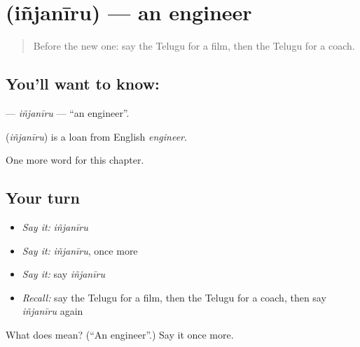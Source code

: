 \section[\texorpdfstring{\te{ఇంజనీరు} (iñjanīru)}{ఇంజనీరు (iñjanīru)}]{ (iñjanīru) — an engineer}

\label{lesson:TE-C312-injaniru}



\begin{quote}
Before the new one: say the Telugu for a film, then the Telugu for a coach.
\end{quote}

\subsection*{You'll want to know: }
\textbf{} — \emph{iñjanīru} — \textquotedblleft{}an engineer\textquotedblright{}.

\begin{cousinweb}
\textbf{} (\emph{iñjanīru}) is a loan from English \emph{engineer}.
\end{cousinweb}

\begin{grammarlens}[title={What you've built}]
One more word for this chapter.
\end{grammarlens}

\subsection*{Your turn}
\begin{itemize}
\raggedright
  \item \emph{Say it:} \emph{iñjanīru}
  \item \emph{Say it:} \emph{iñjanīru}, once more
  \item \emph{Say it:} say \emph{iñjanīru}
  \item \emph{Recall:} say the Telugu for a film, then the Telugu for a coach, then say \emph{iñjanīru} again
\end{itemize}

\begin{tcolorbox}[breakable,colback=teal!4,colframe=teal!35!black,title={Before you move on}]
What does  mean? (\textquotedblleft{}An engineer\textquotedblright{}.) Say it once more.
\end{tcolorbox}
